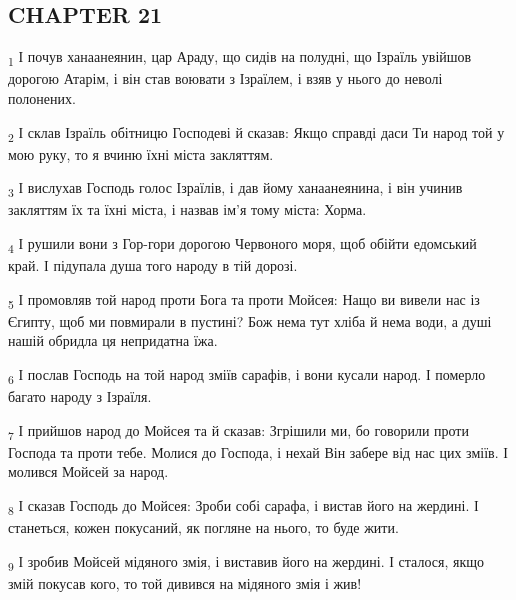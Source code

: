 \subsection{CHAPTER 21}
\begin{tcolorbox}
\textsubscript{1} І почув ханаанеянин, цар Араду, що сидів на полудні, що Ізраїль увійшов дорогою Атарім, і він став воювати з Ізраїлем, і взяв у нього до неволі полонених.
\end{tcolorbox}
\begin{tcolorbox}
\textsubscript{2} І склав Ізраїль обітницю Господеві й сказав: Якщо справді даси Ти народ той у мою руку, то я вчиню їхні міста закляттям.
\end{tcolorbox}
\begin{tcolorbox}
\textsubscript{3} І вислухав Господь голос Ізраїлів, і дав йому ханаанеянина, і він учинив закляттям їх та їхні міста, і назвав ім'я тому міста: Хорма.
\end{tcolorbox}
\begin{tcolorbox}
\textsubscript{4} І рушили вони з Гор-гори дорогою Червоного моря, щоб обійти едомський край. І підупала душа того народу в тій дорозі.
\end{tcolorbox}
\begin{tcolorbox}
\textsubscript{5} І промовляв той народ проти Бога та проти Мойсея: Нащо ви вивели нас із Єгипту, щоб ми повмирали в пустині? Бож нема тут хліба й нема води, а душі нашій обридла ця непридатна їжа.
\end{tcolorbox}
\begin{tcolorbox}
\textsubscript{6} І послав Господь на той народ зміїв сарафів, і вони кусали народ. І померло багато народу з Ізраїля.
\end{tcolorbox}
\begin{tcolorbox}
\textsubscript{7} І прийшов народ до Мойсея та й сказав: Згрішили ми, бо говорили проти Господа та проти тебе. Молися до Господа, і нехай Він забере від нас цих зміїв. І молився Мойсей за народ.
\end{tcolorbox}
\begin{tcolorbox}
\textsubscript{8} І сказав Господь до Мойсея: Зроби собі сарафа, і вистав його на жердині. І станеться, кожен покусаний, як погляне на нього, то буде жити.
\end{tcolorbox}
\begin{tcolorbox}
\textsubscript{9} І зробив Мойсей мідяного змія, і виставив його на жердині. І сталося, якщо змій покусав кого, то той дивився на мідяного змія і жив!
\end{tcolorbox}
